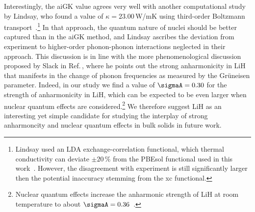 Interestingly, the aiGK value agrees very well with another computational study by Lindsay, who found a value of $\kappa = 23.00$\,W/mK using third-order Boltzmann transport~\cite{lindsay2016}.\footnote{Lindsay used an LDA exchange-correlation functional, which thermal conductivity can deviate $\pm 20\,\%$ from the PBEsol functional used in this work~\cite{Carbogno2016}. However, the disagreement with experiment is still significantly larger then the potential inaccuracy stemming from the xc functional.} In that approach, the quantum nature of nuclei should be better captured than in the aiGK method, and Lindsay ascribes the deviation from experiment to higher-order phonon-phonon interactions neglected in their approach. This discussion is in line with the more phenomenological discussion proposed by Slack in Ref.\,\cite{slack1973}, where he points out the strong anharmonicity in LiH that manifests in the change of phonon frequencies as measured by the Gr\"uneisen parameter. Indeed, in our study we find a value of $\sigmaA = 0.30$ for the strength of anharmonicity in LiH, which can be expected to be even larger when nuclear quantum effects are considered.\footnote{Nuclear quantum effects increase the anharmonic strength of LiH at room temperature to about $\sigmaA = 0.36$~\cite{hengst1}.} We therefore suggest LiH as an interesting yet simple candidate for studying the interplay of strong anharmoncity and nuclear quantum effects in bulk solids in future work.

